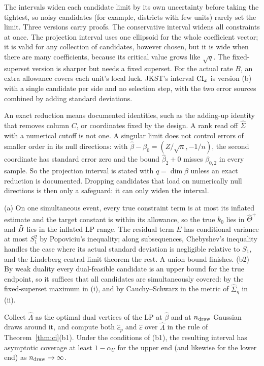 \begin{reading}
The intervals widen each candidate limit by its own uncertainty before taking the
tightest, so noisy candidates (for example, districts with few units) rarely set
the limit. Three versions carry proofs. The conservative interval widens all
constraints at once. The projection interval uses one ellipsoid for the whole
coefficient vector; it is valid for any collection of candidates, however chosen,
but it is wide when there are many coefficients, because its critical value grows
like $\sqrt q$. The fixed-superset version is sharper but needs a fixed superset.
For the actual rate $B$, an extra allowance covers each unit's local luck. JKST's
interval $\mathrm{CI}_x$ is version (b) with a single candidate per side and no selection
step, with the two error sources combined by adding standard deviations.

An exact reduction means documented identities, such as the adding-up identity
that removes column $C$, or coordinates fixed by the design. A rank read off
$\hat\Sigma$ with a numerical cutoff is not one. A singular limit does not control
errors of smaller order in its null directions: with
$\hat\beta-\beta_0=(Z/\sqrt n,-1/n)$, the second coordinate has standard error zero
and the bound $\hat\beta_2+0$ misses $\beta_{0,2}$ in every sample. So the projection
interval is stated with $q=\dim\beta$ unless an exact reduction is documented.
Dropping candidates that load on numerically null directions is then only a
safeguard: it can only widen the interval.
\end{reading}
\begin{sketch}
(a) On one simultaneous event, every true constraint term is at most its inflated
estimate and the target constant is within its allowance, so the true $k_0$ lies in
$\hat\Theta^+$ and $\tilde B$ lies in the inflated LP range. The residual term $E$ has
conditional variance at most $S_1^2$ by Popoviciu's inequality; along
subsequences, Chebyshev's inequality handles the case where its actual standard
deviation is negligible relative to $S_1$, and the Lindeberg central limit theorem
the rest. A union bound finishes. (b2) By weak duality every dual-feasible
candidate is an upper bound for the true endpoint, so it suffices that all
candidates are simultaneously covered: by the fixed-superset maximum in (i), and by
Cauchy--Schwarz in the metric of $\hat\Sigma_\eta$ in (ii).
\end{sketch}

\begin{conjecture}\label{conj:clr}
Collect $\hat\Lambda$ as the optimal dual vertices of the LP at $\hat\beta$ and at
$n_{\rm draw}$ Gaussian draws around it, and compute both $\hat c_p$ and $\hat c$
over $\hat\Lambda$ in the rule of Theorem~\ref{thm:ci}(b1). Under the conditions
of (b1), the resulting interval has asymptotic coverage at least $1-\alpha_U$ for
the upper end (and likewise for the lower end) as $n_{\rm draw}\to\infty$.
\end{conjecture}


